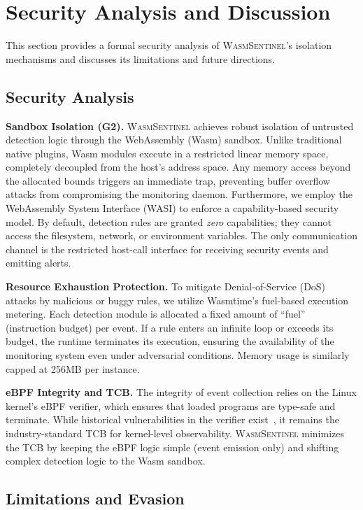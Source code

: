 \section{Security Analysis and Discussion}
\label{sec:discussion}

This section provides a formal security analysis of \textsc{WasmSentinel}'s isolation mechanisms and discusses its limitations and future directions.

\subsection{Security Analysis}

\textbf{Sandbox Isolation (G2).}
\textsc{WasmSentinel} achieves robust isolation of untrusted detection logic through the WebAssembly (Wasm) sandbox.
Unlike traditional native plugins, Wasm modules execute in a restricted linear memory space, completely decoupled from the host's address space.
Any memory access beyond the allocated bounds triggers an immediate trap, preventing buffer overflow attacks from compromising the monitoring daemon.
Furthermore, we employ the WebAssembly System Interface (WASI) to enforce a capability-based security model.
By default, detection rules are granted \textit{zero} capabilities; they cannot access the filesystem, network, or environment variables.
The only communication channel is the restricted host-call interface for receiving security events and emitting alerts.

\textbf{Resource Exhaustion Protection.}
To mitigate Denial-of-Service (DoS) attacks by malicious or buggy rules, we utilize Wasmtime's fuel-based execution metering.
Each detection module is allocated a fixed amount of ``fuel'' (instruction budget) per event.
If a rule enters an infinite loop or exceeds its budget, the runtime terminates its execution, ensuring the availability of the monitoring system even under adversarial conditions.
Memory usage is similarly capped at 256MB per instance.

\textbf{eBPF Integrity and TCB.}
The integrity of event collection relies on the Linux kernel's eBPF verifier, which ensures that loaded programs are type-safe and terminate.
While historical vulnerabilities in the verifier exist~\cite{ebpf-bugs}, it remains the industry-standard TCB for kernel-level observability.
\textsc{WasmSentinel} minimizes the TCB by keeping the eBPF logic simple (event emission only) and shifting complex detection logic to the Wasm sandbox.

\subsection{Limitations and Evasion}

